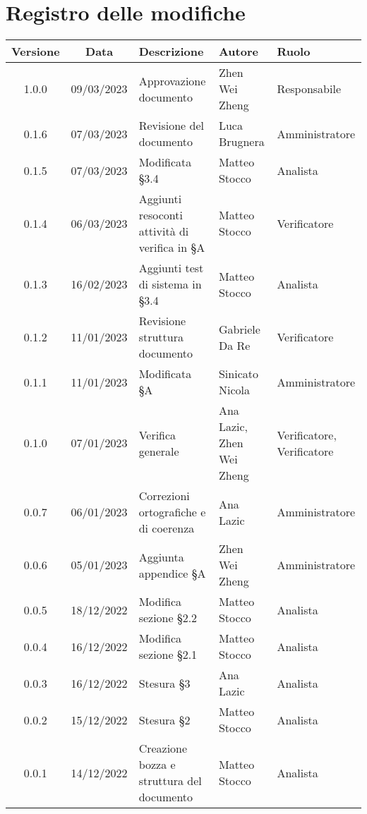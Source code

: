 \section*{Registro delle modifiche}
\begin{center}
\setlength\extrarowheight{5pt}
\renewcommand\tabularxcolumn[1]{>{\Centering}m{#1}}
\begin{tabularx}{\textwidth}{| c | c | X | X | X |} 
	\hline
	\rowcolor{white}
	\textbf{Versione} & \textbf{Data} & \textbf{Descrizione} & \textbf{Autore} & \textbf{Ruolo}\\
	\hline
	1.0.0 & 09/03/2023 & Approvazione documento & Zhen Wei Zheng & Responsabile \\
	\hline
	0.1.6 & 07/03/2023 & Revisione del documento & Luca Brugnera & Amministratore \\
	\hline
	0.1.5 & 07/03/2023 & Modificata §3.4 & Matteo Stocco & Analista \\
	\hline
	0.1.4 & 06/03/2023 & Aggiunti resoconti attività di verifica in §A & Matteo Stocco & Verificatore \\
    \hline
    0.1.3 & 16/02/2023 & Aggiunti test di sistema in §3.4 & Matteo Stocco & Analista \\
    \hline
	0.1.2 & 11/01/2023 & Revisione struttura documento & Gabriele Da Re & Verificatore \\
	\hline
	0.1.1 & 11/01/2023 & Modificata §A & Sinicato Nicola &Amministratore \\
    \hline
	0.1.0 & 07/01/2023 & Verifica generale & Ana Lazic, Zhen Wei Zheng & Verificatore, Verificatore \\
    \hline
	0.0.7 & 06/01/2023 & Correzioni ortografiche e di coerenza & Ana Lazic & Amministratore \\
	\hline
	0.0.6 & 05/01/2023 & Aggiunta appendice §A & Zhen Wei Zheng & Amministratore \\
	\hline
	0.0.5 & 18/12/2022 & Modifica sezione §2.2 & Matteo Stocco & Analista \\
	\hline
	0.0.4 & 16/12/2022 & Modifica sezione §2.1 & Matteo Stocco & Analista \\
     \hline
	0.0.3 & 16/12/2022 & Stesura §3 & Ana Lazic & Analista \\
	\hline
	0.0.2 & 15/12/2022 & Stesura §2 & Matteo Stocco & Analista \\
	\hline
	0.0.1 & 14/12/2022 & Creazione bozza e struttura del documento & Matteo Stocco & Analista \\
	\hline
	\end{tabularx}
\end{center}
